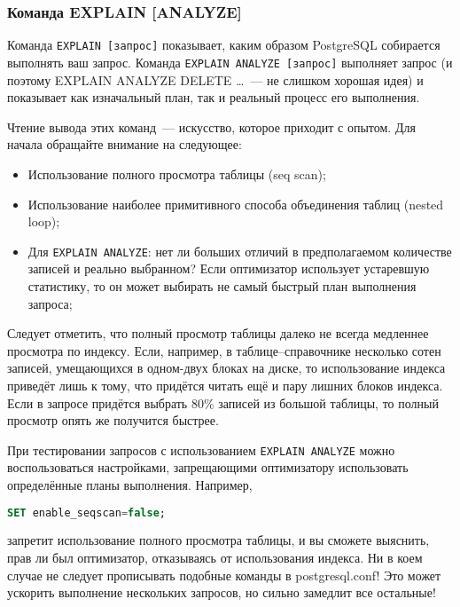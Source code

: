 \subsubsection{Команда EXPLAIN [ANALYZE]}

Команда \lstinline!EXPLAIN [запрос]! показывает, каким образом PostgreSQL собирается выполнять ваш запрос. Команда \lstinline!EXPLAIN ANALYZE [запрос]! выполняет запрос (и поэтому EXPLAIN ANALYZE DELETE \dots~--- не слишком хорошая идея) и показывает как изначальный план, так и реальный процесс его выполнения.

Чтение вывода этих команд~--- искусство, которое приходит с опытом. Для начала обращайте внимание на следующее:

\begin{itemize}
  \item Использование полного просмотра таблицы (seq scan);
  \item Использование наиболее примитивного способа объединения таблиц (nested loop);
  \item Для \lstinline!EXPLAIN ANALYZE!: нет ли больших отличий в предполагаемом количестве записей и реально выбранном? Если оптимизатор использует устаревшую статистику, то он может выбирать не самый быстрый план выполнения запроса;
\end{itemize}

Следует отметить, что полный просмотр таблицы далеко не всегда медленнее просмотра по индексу. Если, например, в таблице--справочнике несколько сотен записей, умещающихся в одном-двух блоках на диске, то использование индекса приведёт лишь к тому, что придётся читать ещё и пару лишних блоков индекса. Если в запросе придётся выбрать 80\% записей из большой таблицы, то полный просмотр опять же получится быстрее.

При тестировании запросов с использованием \lstinline!EXPLAIN ANALYZE! можно воспользоваться настройками, запрещающими оптимизатору использовать определённые планы выполнения. Например,

\begin{lstlisting}[language=SQL,label=lst:summary-explain1,caption=enable\_seqscan]
SET enable_seqscan=false;
\end{lstlisting}

запретит использование полного просмотра таблицы, и вы сможете выяснить, прав ли был оптимизатор, отказываясь от использования индекса. Ни в коем случае не следует прописывать подобные команды в postgresql.conf! Это может ускорить выполнение нескольких запросов, но сильно замедлит все остальные!


